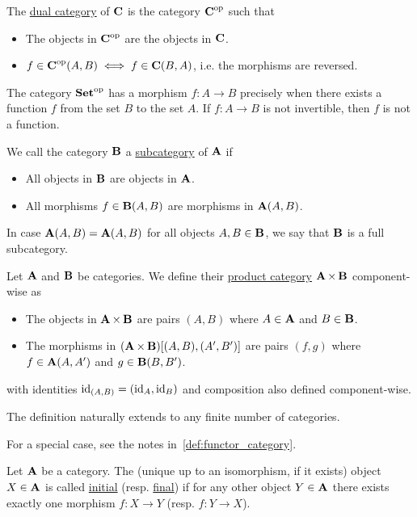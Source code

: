 \begin{definition}\label{def:dual_category}\cite[construction 1.1.9]{Leinster2014}
  The \uline{dual category} of $\operatorname{\mathbf{C}}$ is the category $\operatorname{\mathbf{C}}^{\operatorname{op}}$ such that
  \begin{itemize}
    \item The objects in $\operatorname{\mathbf{C}}^{\operatorname{op}}$ are the objects in $\operatorname{\mathbf{C}}$.
    \item $f \in \operatorname{\mathbf{C}}^{\operatorname{op}}(A, B) \iff f \in \operatorname{\mathbf{C}}(B, A)$, i.e. the morphisms are reversed.
  \end{itemize}
\end{definition}

\begin{example}
  The category $\operatorname{\mathbf{Set}}^{\operatorname{op}}$ has a morphism $f: A \to B$ precisely when there exists a function $f$ from the set $B$ to the set $A$. If $f: A \to B$ is not invertible, then $f$ is not a function.
\end{example}

\begin{definition}\label{def:subcategory}\cite[definition 1.2.18]{Leinster2014}
  We call the category $\operatorname{\mathbf{B}}$ a \uline{subcategory} of $\operatorname{\mathbf{A}}$ if
  \begin{itemize}
    \item All objects in $\operatorname{\mathbf{B}}$ are objects in $\operatorname{\mathbf{A}}$.
    \item All morphisms $f \in \operatorname{\mathbf{B}}(A, B)$ are morphisms in $\operatorname{\mathbf{A}}(A, B)$.
  \end{itemize}

  In case $\operatorname{\mathbf{A}}(A, B) = \operatorname{\mathbf{A}}(A, B)$ for all objects $A, B \in \operatorname{\mathbf{B}}$, we say that $\operatorname{\mathbf{B}}$ is a full subcategory.
\end{definition}

\begin{definition}\label{def:product_category}\cite[exercise 1.1.14]{Leinster2014}
  Let $\operatorname{\mathbf{A}}$ and $\operatorname{\mathbf{B}}$ be categories. We define their \uline{product category} $\operatorname{\mathbf{A}} \times \operatorname{\mathbf{B}}$ component-wise as
  \begin{itemize}
    \item The objects in $\operatorname{\mathbf{A}} \times \operatorname{\mathbf{B}}$ are pairs $(A, B)$ where $A \in \operatorname{\mathbf{A}}$ and $B \in \operatorname{\mathbf{B}}$.
    \item The morphisms in $(\operatorname{\mathbf{A}} \times \operatorname{\mathbf{B}})[(A, B), (A', B')]$ are pairs $(f, g)$ where $f \in \operatorname{\mathbf{A}}(A, A')$ and $g \in \operatorname{\mathbf{B}}(B, B')$.
  \end{itemize}
  with identities $\operatorname{id}_{(A,B)} =(\operatorname{id}_A, \operatorname{id}_B)$ and composition also defined component-wise.

  The definition naturally extends to any finite number of categories.

  For a special case, see the notes in~\cref{def:functor_category}.
\end{definition}

\begin{definition}\label{def:initial_final_objects}\cite[definitions 2.1.7]{Leinster2014}
  Let $\operatorname{\mathbf{A}}$ be a category. The (unique up to an isomorphism, if it exists) object $X \in \operatorname{\mathbf{A}}$ is called \uline{initial} (resp. \uline{final}) if for any other object $Y \in \operatorname{\mathbf{A}}$ there exists exactly one morphism $f: X \to Y$ (resp. $f: Y \to X$).
\end{definition}

